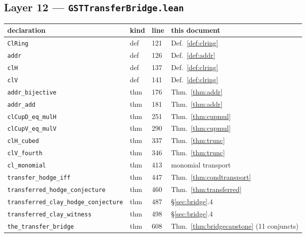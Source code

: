 \documentclass[11pt,a4paper]{article}
\theoremstyle{plain}
\theoremstyle{definition}
\begin{document}
\subsection{Layer 12 --- \texttt{GSTTransferBridge.lean}}
\begingroup\small
\begin{longtable}{@{}p{4.6cm}p{1.0cm}p{1.1cm}p{7.0cm}@{}}
\toprule
declaration & kind & line & this document \\
\midrule
\texttt{ClRing} & def & 121 & Def.~\ref{def:clring} \\
\texttt{addr} & def & 126 & Def.~\ref{def:addr} \\
\texttt{clH} & def & 137 & Def.~\ref{def:clring} \\
\texttt{clV} & def & 141 & Def.~\ref{def:clring} \\
\texttt{addr\_bijective} & thm & 176 & Thm.~\ref{thm:addr} \\
\texttt{addr\_add} & thm & 181 & Thm.~\ref{thm:addr} \\
\texttt{clCupD\_eq\_mulH} & thm & 251 & Thm.~\ref{thm:cupmul} \\
\texttt{clCupV\_eq\_mulV} & thm & 290 & Thm.~\ref{thm:cupmul} \\
\texttt{clH\_cubed} & thm & 337 & Thm.~\ref{thm:trunc} \\
\texttt{clV\_fourth} & thm & 346 & Thm.~\ref{thm:trunc} \\
\texttt{cl\_monomial} & thm & 413 & monomial transport \\
\texttt{transfer\_hodge\_iff} & thm & 447 & Thm.~\ref{thm:condtransport} \\
\texttt{transferred\_hodge\_conjecture} & thm & 460 & Thm.~\ref{thm:transferred} \\
\texttt{transferred\_clay\_hodge\_conjecture} & thm & 487 & \S\ref{sec:bridge}.4 \\
\texttt{transferred\_clay\_witness} & thm & 498 & \S\ref{sec:bridge}.4 \\
\texttt{the\_transfer\_bridge} & thm & 608 & Thm.~\ref{thm:bridgecapstone} (11 conjuncts) \\
\bottomrule
\end{longtable}
\endgroup
\end{document}
